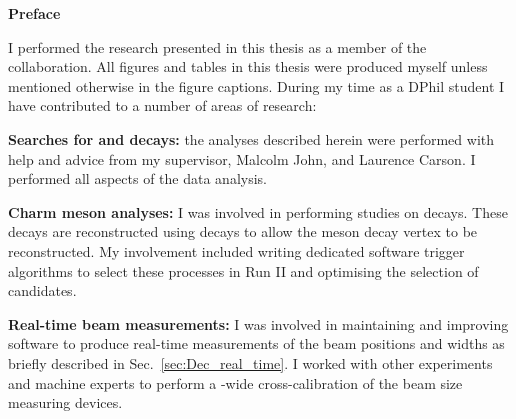 \begin{alwayssingle} 
 \thispagestyle{empty}
 \begin{center}
   \vspace*{1.5cm}
   {\Large \bfseries  Preface}
 \end{center}
 \vspace{0.5cm}
 I performed the research presented in this thesis as a member of the \lhcb collaboration. All figures and tables in this thesis were produced myself unless mentioned otherwise in the figure captions.  
During my time as a DPhil student I have contributed to a number of areas of research: 
 \begin{description}
 \item \textbf{Searches for \decay{\Bp}{\Dsp\phiz} and \decay{\Bp}{\Dsp\Kp\Km} decays:} the analyses described herein were performed with help and advice from my supervisor, Malcolm John, and Laurence Carson. I performed all aspects of the data analysis. 

 \item \textbf{Charm meson analyses:} I was involved in performing studies on \decay{\Dp}{\pip\piz} decays. These decays are reconstructed using \decay{\piz}{\ep\en\Pgamma} decays to allow the \Dp meson decay vertex to be reconstructed. My involvement included writing dedicated software trigger algorithms to select these processes in Run II and optimising the selection of candidates.  

 \item \textbf{Real-time beam measurements:} I was involved in maintaining and improving software to produce real-time measurements of the \lhc beam positions and widths as briefly described in Sec.~\ref{sec:Dec_real_time}. I worked with other experiments and \lhc machine experts to perform a \lhc-wide cross-calibration of the beam size measuring devices.  


 \end{description}

\end{alwayssingle}



